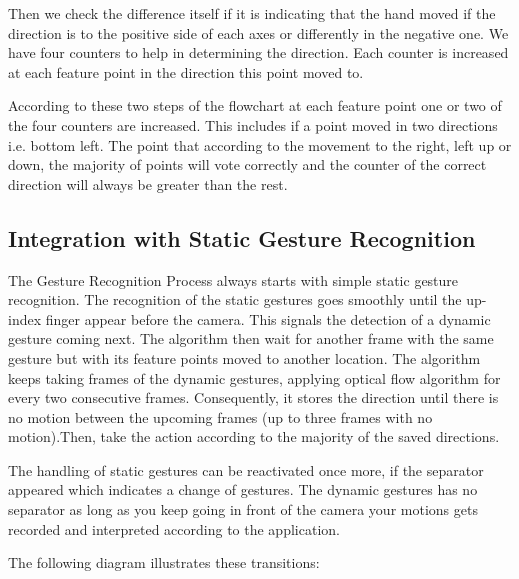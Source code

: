 Then we check the difference itself if it is indicating that the hand moved if the direction is to the positive side of each axes or differently in the negative one. We have four counters to help in determining the direction. Each counter is increased at each feature point in the direction this point moved to.\bigskip


According to these two steps of the flowchart at each feature point one or two of the four counters are increased. This includes if a point moved in two directions i.e. bottom left. The point that according to the movement to the right, left up or down, the majority of points will vote correctly and the counter of the correct direction will always be greater than the rest. \bigskip

\subsection{Integration with Static Gesture Recognition}
The Gesture Recognition Process always starts with simple static gesture recognition. The recognition of the static gestures goes smoothly until the up-index finger appear before the camera. This signals the detection of a dynamic gesture coming next. The algorithm then wait for another frame with the same gesture but with its feature points moved to another location. The algorithm keeps taking frames of the dynamic gestures, applying optical flow algorithm for every two consecutive frames. Consequently, it stores the direction until there is no motion between the upcoming frames (up to three frames with no motion).Then, take the action according to the majority of the saved directions.\bigskip


The handling of static gestures can be reactivated once more, if the separator appeared which indicates a change of gestures. The dynamic gestures has no separator as long as you keep going in front of the camera your motions gets recorded and interpreted according to the application.\bigskip


The following diagram illustrates these transitions:

